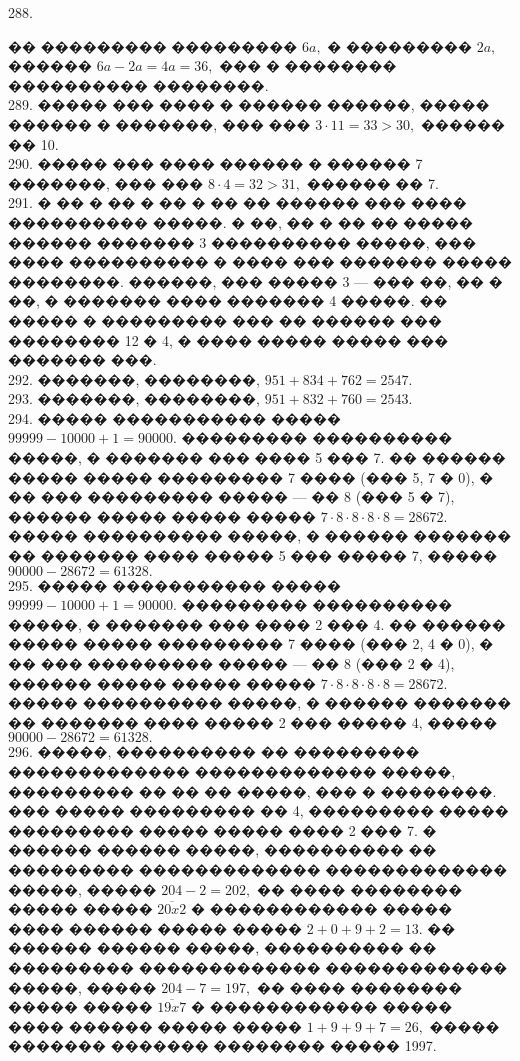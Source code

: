 \documentclass[12pt]{article}
\begin{document}
288. \begin{center}
\begin{figure}[ht!]
\end{figure}
\end{center}
�� ��������� ��������� $6a,$ � ��������� $2a,$ ������ $6a-2a=4a=36,$ ��� � �������� ���������� ��������.\\
289. ����� ��� ���� � ������ ������, ����� ������ � �������, ��� ��� $3\cdot11=33>30,$ ������ �� 10.\\
290. ����� ��� ���� ������ � ������ 7 �������, ��� ��� $8\cdot4=32>31,$ ������ �� 7.\\
291. � �� � �� � �� � �� �� ������ ��� ���� ���������� �����. � ��, �� � �� �� ����� ������ ������� 3 ���������� �����, ��� ���� ���������� � ���� ��� ������� ����� ��������. ������, ��� ����� 3 --- ��� ��, �� � ��, � ������� ���� ������� 4 �����. �� ����� � ��������� ��� �� ������ ��� �������� 12 � 4, � ���� ����� ����� ��� ������� ���.\\
292. �������, ��������, $951+834+762=2547.$\\
293. �������, ��������, $951+832+760=2543.$\\
294. ����� ����������� ����� $99999-10000+1=90000.$ ��������� ���������� �����, � ������� ��� ���� 5 ��� 7. �� ������ ����� ����� ��������� 7 ���� (��� 5, 7 � 0), � �� ��� ��������� ����� --- �� 8 (��� 5 � 7), ������ ����� ����� ����� $7\cdot8\cdot8\cdot8\cdot8=28672.$ ����� ���������� �����, � ������ ������� �� ������� ���� ����� 5 ��� ����� 7, ����� $90000-28672=61328.$\\
295. ����� ����������� ����� $99999-10000+1=90000.$ ��������� ���������� �����, � ������� ��� ���� 2 ��� 4. �� ������ ����� ����� ��������� 7 ���� (��� 2, 4 � 0), � �� ��� ��������� ����� --- �� 8 (��� 2 � 4), ������ ����� ����� ����� $7\cdot8\cdot8\cdot8\cdot8=28672.$ ����� ���������� �����, � ������ ������� �� ������� ���� ����� 2 ��� ����� 4, ����� $90000-28672=61328.$\\
296. �����, ���������� �� ��������� ������������� ������������� �����, ��������� �� �� �� �����, ��� � ��������. ��� ����� ��������� �� 4, ��������� ����� ��������� ����� ����� ���� 2 ��� 7. � ������ ������ �����, ���������� �� ��������� ������������� ������������� �����, ����� $204-2=202,$ �� ���� �������� ����� ����� $\overline{20x2}$ � ������������ ����� ���� ������ ����� ����� $2+0+9+2=13.$ �� ������ ������ �����, ���������� �� ��������� ������������� ������������� �����, ����� $204-7=197,$ �� ���� �������� ����� ����� $\overline{19x7}$ � ������������ ����� ���� ������ ����� ����� $1+9+9+7=26,$ ����� ������� ������� �������� ����� 1997.\\
\end{document}
